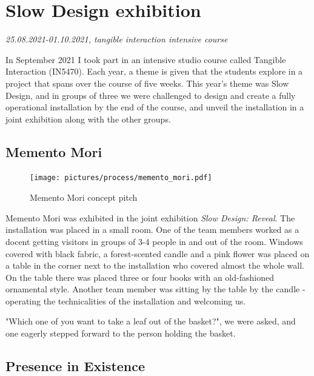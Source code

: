 \section{Slow Design exhibition}
\par
\emph{25.08.2021-01.10.2021, tangible interaction intensive course}
\par

In September 2021 I took part in an intensive studio course called Tangible Interaction (IN5470). Each year, a theme is given that the students explore in a project that spans over the course of five weeks. This year's theme was Slow Design, and in groups of three we were challenged to design and create a fully operational installation by the end of the course, and unveil the installation in a joint exhibition along with the other groups. 

\subsection{Memento Mori}

\begin{figure}[H]
\texttt{[image: pictures/process/memento\_mori.pdf]}
\caption{Memento Mori concept pitch}
\centering 
\end{figure}

Memento Mori was exhibited in the joint exhibition \emph{Slow Design: Reveal}. The installation was placed in a small room. One of the team members worked as a docent getting visitors in groups of 3-4 people in and out of the room. Windows covered with black fabric, a forest-scented candle and a pink flower was placed on a table in the corner next to the installation who covered almost the whole wall. On the table there was placed three or four books with an old-fashioned ornamental style. Another team member was sitting by the table by the candle - operating the technicalities of the installation and welcoming us.

"Which one of you want to take a leaf out of the basket?", we were asked, and one eagerly stepped forward to the person holding the basket. 




\subsection{Presence in Existence}

